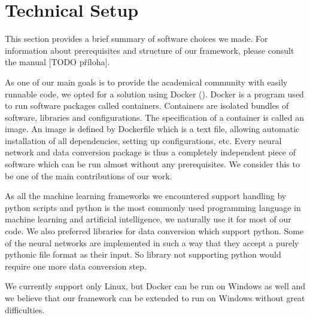 \section{Technical Setup}
This section provides a brief summary of software choices we made. For information about prerequisites and structure of our framework, please consult the manual [TODO příloha]. \par
As one of our main goals is to provide the academical community with easily runnable code, we opted for a solution using Docker (\cite{merkel_docker:_2014}). Docker is a program used to run software packages called containers. Containers are isolated bundles of software, libraries and configurations. The specification of a container is called an image. An image is defined by Dockerfile which is a text file, allowing automatic installation of all dependencies, setting up configurations, etc. Every neural network and data conversion package is thus a completely independent piece of software which can be run almost without any prerequisites. We consider this to be one of the main contributions of our work. \par
As all the machine learning frameworks we encountered support handling by python scripts and python is the most commonly used programming language in machine learning and artificial intelligence, we naturally use it for most of our code. We also preferred libraries for data conversion which support python. Some of the neural networks are implemented in such a way that they accept a purely pythonic file format as their input. So library not supporting python would require one more data conversion step.\par
We currently support only Linux, but Docker can be run on Windows as well and we believe that our framework can be extended to run on Windows without great difficulties. 
